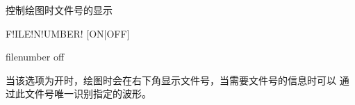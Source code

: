 \label{cmd:filenumber}

控制绘图时文件号的显示

\begin{SACSTX}
F!ILE!N!UMBER! [ON|OFF]
\end{SACSTX}

\begin{SACDFT}
filenumber off
\end{SACDFT}

当该选项为开时，绘图时会在右下角显示文件号，当需要文件号的信息时可以
通过此文件号唯一识别指定的波形。
